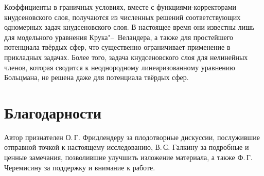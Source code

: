 \documentclass[
aps,%
12pt,%
final,%
notitlepage,%
oneside,%
onecolumn,%
nobibnotes,%
nofootinbib,%
superscriptaddress,%
noshowpacs,%
showkeys,%
floatfix,%
tightenlines,%
centertags]%
{revtex4}
\begin{document}
Коэффициенты в граничных условиях, вместе с функциями-корректорами кнудсеновского слоя,
получаются из численных решений соответствующих одномерных задач кнудсеновского слоя.
В настоящее время они известны лишь для модельного уравнения Крука"--~Веландера,
а также для простейшего потенциала твёрдых сфер, что существенно ограничивает применение
в прикладных задачах.
Более того, задача кнудсеновского слоя для нелинейных членов, которая сводится к неоднородному
линеаризованному уравнению Больцмана, не решена даже для потенциала твёрдых сфер.

\section*{Благодарности}

Автор признателен О.\,Г. Фридлендеру за плодотворные дискуссии,
послужившие отправной точкой к настоящему исследованию,
В.\,С. Галкину за подробные и ценные замечания, позволившие улучшить изложение материала,
а также Ф.\,Г. Черемисину за поддержку и внимание к работе.



\end{document}
